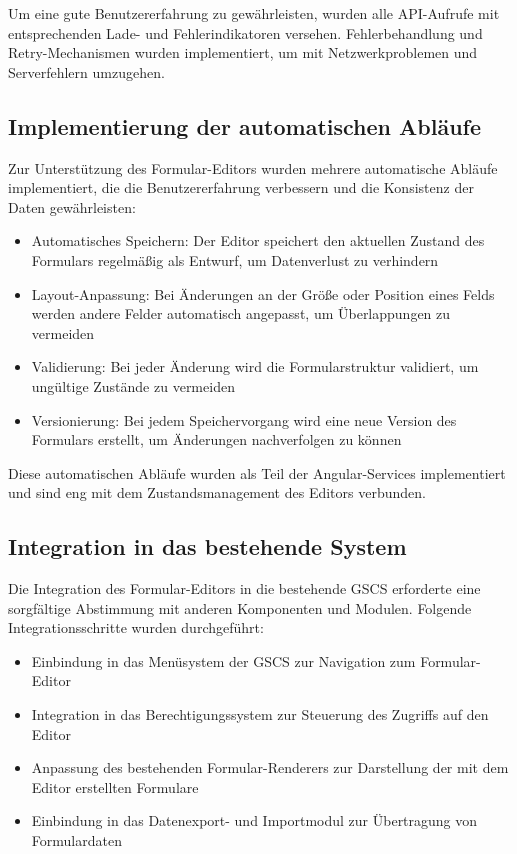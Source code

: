 \documentclass[a4paper,11pt]{article}
\begin{document}
Um eine gute Benutzererfahrung zu gewährleisten, wurden alle API-Aufrufe mit entsprechenden Lade- und Fehlerindikatoren versehen. Fehlerbehandlung und Retry-Mechanismen wurden implementiert, um mit Netzwerkproblemen und Serverfehlern umzugehen.

\subsection{Implementierung der automatischen Abläufe}
Zur Unterstützung des Formular-Editors wurden mehrere automatische Abläufe implementiert, die die Benutzererfahrung verbessern und die Konsistenz der Daten gewährleisten:

\begin{itemize}
  \item Automatisches Speichern: Der Editor speichert den aktuellen Zustand des Formulars regelmäßig als Entwurf, um Datenverlust zu verhindern
  \item Layout-Anpassung: Bei Änderungen an der Größe oder Position eines Felds werden andere Felder automatisch angepasst, um Überlappungen zu vermeiden
  \item Validierung: Bei jeder Änderung wird die Formularstruktur validiert, um ungültige Zustände zu vermeiden
  \item Versionierung: Bei jedem Speichervorgang wird eine neue Version des Formulars erstellt, um Änderungen nachverfolgen zu können
\end{itemize}

Diese automatischen Abläufe wurden als Teil der Angular-Services implementiert und sind eng mit dem Zustandsmanagement des Editors verbunden.

\subsection{Integration in das bestehende System}
Die Integration des Formular-Editors in die bestehende GSCS erforderte eine sorgfältige Abstimmung mit anderen Komponenten und Modulen. Folgende Integrationsschritte wurden durchgeführt:

\begin{itemize}
  \item Einbindung in das Menüsystem der GSCS zur Navigation zum Formular-Editor
  \item Integration in das Berechtigungssystem zur Steuerung des Zugriffs auf den Editor
  \item Anpassung des bestehenden Formular-Renderers zur Darstellung der mit dem Editor erstellten Formulare
  \item Einbindung in das Datenexport- und Importmodul zur Übertragung von Formulardaten
\end{itemize}
\end{document}
